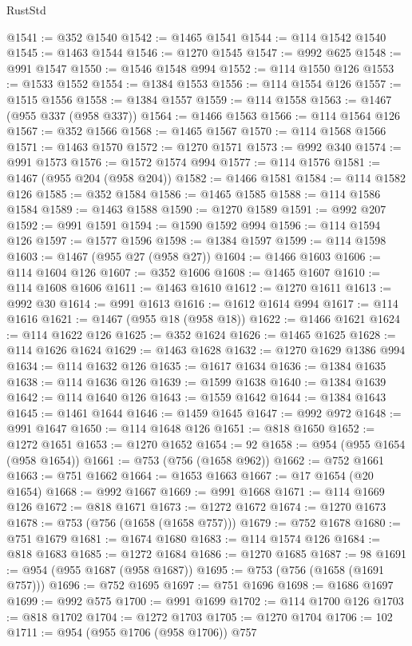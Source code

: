 \begin{lexlean}{RustStd}
\begin{coremodule}
{\begin{coremodule}
{{{{{{{{{{{{{{{{{{{{{{{{{{{{{{{{{{{{{{{{{{{{{{{{{{@1541 := @352 @1540
@1542 := @1465 @1541
@1544 := @114 @1542 @1540
@1545 := @1463 @1544
@1546 := @1270 @1545
@1547 := @992 @625
@1548 := @991 @1547
@1550 := @1546 @1548 @994
@1552 := @114 @1550 @126
@1553 := @1533 @1552
@1554 := @1384 @1553
@1556 := @114 @1554 @126
@1557 := @1515 @1556
@1558 := @1384 @1557
@1559 := @114 @1558
@1563 := @1467 (@955 @337 (@958 @337))
@1564 := @1466 @1563
@1566 := @114 @1564 @126
@1567 := @352 @1566
@1568 := @1465 @1567
@1570 := @114 @1568 @1566
@1571 := @1463 @1570
@1572 := @1270 @1571
@1573 := @992 @340
@1574 := @991 @1573
@1576 := @1572 @1574 @994
@1577 := @114 @1576
@1581 := @1467 (@955 @204 (@958 @204))
@1582 := @1466 @1581
@1584 := @114 @1582 @126
@1585 := @352 @1584
@1586 := @1465 @1585
@1588 := @114 @1586 @1584
@1589 := @1463 @1588
@1590 := @1270 @1589
@1591 := @992 @207
@1592 := @991 @1591
@1594 := @1590 @1592 @994
@1596 := @114 @1594 @126
@1597 := @1577 @1596
@1598 := @1384 @1597
@1599 := @114 @1598
@1603 := @1467 (@955 @27 (@958 @27))
@1604 := @1466 @1603
@1606 := @114 @1604 @126
@1607 := @352 @1606
@1608 := @1465 @1607
@1610 := @114 @1608 @1606
@1611 := @1463 @1610
@1612 := @1270 @1611
@1613 := @992 @30
@1614 := @991 @1613
@1616 := @1612 @1614 @994
@1617 := @114 @1616
@1621 := @1467 (@955 @18 (@958 @18))
@1622 := @1466 @1621
@1624 := @114 @1622 @126
@1625 := @352 @1624
@1626 := @1465 @1625
@1628 := @114 @1626 @1624
@1629 := @1463 @1628
@1632 := @1270 @1629 @1386 @994
@1634 := @114 @1632 @126
@1635 := @1617 @1634
@1636 := @1384 @1635
@1638 := @114 @1636 @126
@1639 := @1599 @1638
@1640 := @1384 @1639
@1642 := @114 @1640 @126
@1643 := @1559 @1642
@1644 := @1384 @1643
@1645 := @1461 @1644
@1646 := @1459 @1645
@1647 := @992 @972
@1648 := @991 @1647
@1650 := @114 @1648 @126
@1651 := @818 @1650
@1652 := @1272 @1651
@1653 := @1270 @1652
@1654 := 92
@1658 := @954 (@955 @1654 (@958 @1654))
@1661 := @753 (@756 (@1658 @962))
@1662 := @752 @1661
@1663 := @751 @1662
@1664 := @1653 @1663
@1667 := @17 @1654 (@20 @1654)
@1668 := @992 @1667
@1669 := @991 @1668
@1671 := @114 @1669 @126
@1672 := @818 @1671
@1673 := @1272 @1672
@1674 := @1270 @1673
@1678 := @753 (@756 (@1658 (@1658 @757)))
@1679 := @752 @1678
@1680 := @751 @1679
@1681 := @1674 @1680
@1683 := @114 @1574 @126
@1684 := @818 @1683
@1685 := @1272 @1684
@1686 := @1270 @1685
@1687 := 98
@1691 := @954 (@955 @1687 (@958 @1687))
@1695 := @753 (@756 (@1658 (@1691 @757)))
@1696 := @752 @1695
@1697 := @751 @1696
@1698 := @1686 @1697
@1699 := @992 @575
@1700 := @991 @1699
@1702 := @114 @1700 @126
@1703 := @818 @1702
@1704 := @1272 @1703
@1705 := @1270 @1704
@1706 := 102
@1711 := @954 (@955 @1706 (@958 @1706)) @757
}}}}}}}}}}}}}}}}}}}}}}}}}}}}}}}}}}}}}}}}}}}}}}}}}}
\end{coremodule}}
\end{coremodule}
\end{lexlean}
